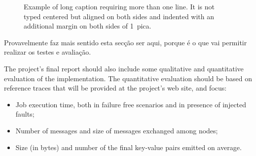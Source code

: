 \documentclass[times, 10pt,twocolumn]{article}
\begin{document}
	
	\begin{figure}[h] 
		\caption{Example of long caption requiring more than one line. It is 
			not typed centered but aligned on both sides and indented with an 
			additional margin on both sides of 1~pica.}
	\end{figure}
	
	Provavelmente faz mais sentido esta secção ser aqui, porque é o que vai permitir realizar os testes e avaliação.
	
	
	
	
	
	
	
	
	
	The project’s final report should also include some	qualitative and quantitative evaluation of the implementation. The quantitative evaluation should be based on reference traces that will be provided at the project’s web site, and focus:
	\begin{itemize}
		\item Job execution time, both in failure free scenarios and in presence of injected faults;
		\item Number of messages and size of messages exchanged among nodes;
		\item Size (in bytes) and number of the final key-value pairs emitted on average. 
	\end{itemize}	
	
	
	\nocite{ex1,ex2}
	
	
	
\end{document}
